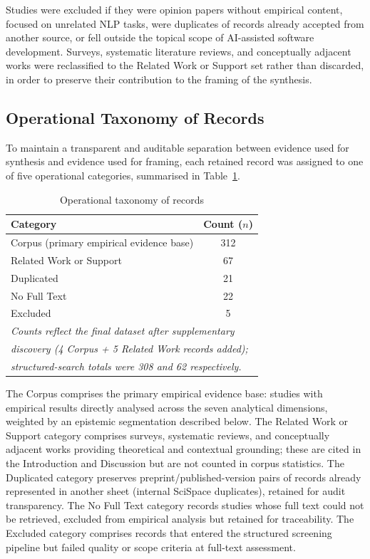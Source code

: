 Studies were excluded if they were opinion papers without empirical content, focused on unrelated NLP tasks, were duplicates of records already accepted from another source, or fell outside the topical scope of AI-assisted software development. Surveys, systematic literature reviews, and conceptually adjacent works were reclassified to the Related Work or Support set rather than discarded, in order to preserve their contribution to the framing of the synthesis.

\subsection{Operational Taxonomy of Records}
\label{sec:taxonomy}
To maintain a transparent and auditable separation between evidence used for synthesis and evidence used for framing, each retained record was assigned to one of five operational categories, summarised in Table~\ref{tab:taxonomy}.

\begin{table}[h]
\centering
\caption{Operational taxonomy of records}
\label{tab:taxonomy}
\begin{tabular}{l c}
\hline
\textbf{Category} & \textbf{Count ($n$)} \\
\hline
Corpus (primary empirical evidence base) & 312 \\
Related Work or Support & 67 \\
Duplicated & 21 \\
No Full Text & 22 \\
Excluded & 5 \\
\hline
\multicolumn{2}{l}{\footnotesize\textit{Counts reflect the final dataset after supplementary}} \\
\multicolumn{2}{l}{\footnotesize\textit{discovery (4 Corpus + 5 Related Work records added);}} \\
\multicolumn{2}{l}{\footnotesize\textit{structured-search totals were 308 and 62 respectively.}} \\
\hline
\end{tabular}
\end{table}

The Corpus comprises the primary empirical evidence base: studies with empirical results directly analysed across the seven analytical dimensions, weighted by an epistemic segmentation described below. The Related Work or Support category comprises surveys, systematic reviews, and conceptually adjacent works providing theoretical and contextual grounding; these are cited in the Introduction and Discussion but are not counted in corpus statistics. The Duplicated category preserves preprint/published-version pairs of records already represented in another sheet (internal SciSpace duplicates), retained for audit transparency. The No Full Text category records studies whose full text could not be retrieved, excluded from empirical analysis but retained for traceability. The Excluded category comprises records that entered the structured screening pipeline but failed quality or scope criteria at full-text assessment.

